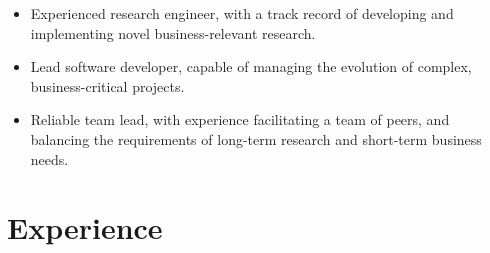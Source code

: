 \documentclass[12pt,a4paper,sans]{moderncv}
\begin{document}
\maketitle

\begin{itemize}
  \item Experienced research engineer, with a track record of developing and
    implementing novel business-relevant research.
  \item Lead software developer, capable of managing the evolution of complex, business-critical
    projects.
  \item Reliable team lead, with experience facilitating a team of peers, and
    balancing the requirements of long-term research and short-term business needs.
\end{itemize}

\section{Experience}
\end{document}
